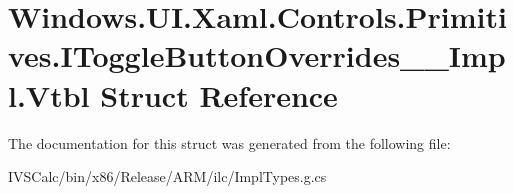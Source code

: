 \hypertarget{struct_windows_1_1_u_i_1_1_xaml_1_1_controls_1_1_primitives_1_1_i_toggle_button_overrides_____impl_1_1_vtbl}{}\section{Windows.\+U\+I.\+Xaml.\+Controls.\+Primitives.\+I\+Toggle\+Button\+Overrides\+\_\+\+\_\+\+Impl.\+Vtbl Struct Reference}
\label{struct_windows_1_1_u_i_1_1_xaml_1_1_controls_1_1_primitives_1_1_i_toggle_button_overrides_____impl_1_1_vtbl}


The documentation for this struct was generated from the following file\+:\begin{DoxyCompactItemize}
\item 
I\+V\+S\+Calc/bin/x86/\+Release/\+A\+R\+M/ilc/Impl\+Types.\+g.\+cs\end{DoxyCompactItemize}
